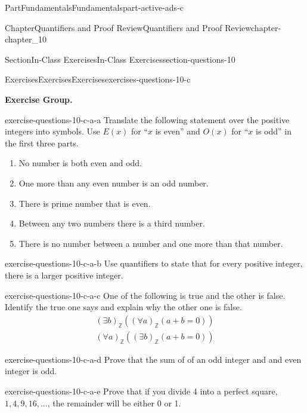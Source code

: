 \documentclass[oneside,10pt,]{book}
\numberwithin{equation}{section}
\begin{document}
\begin{partptx}{Part}{Fundamentals}{}{Fundamentals}{}{}{part-active-ads-c}
\begin{chapterptx}{Chapter}{Quantifiers and Proof Review}{}{Quantifiers and Proof Review}{}{}{chapter-chapter_10}
\begin{sectionptx}{Section}{In-Class Exercises}{}{In-Class Exercises}{}{}{section-questions-10}
%
\begin{exercises-subsection-numberless}{Exercises}{Exercises}{}{Exercises}{}{}{exercises-questions-10-c}
\par\medskip\noindent%
\textbf{Exercise Group.}\space\space%
\begin{exercisegroup}
\begin{divisionexerciseeg}{1}{}{}{exercise-questions-10-c-a-a}%
Translate the following statement over the positive integers into symbols. Use \(E(x)\) for ``\(x\) is even'' and \(O(x)\) for ``\(x\) is odd'' in the first three parts.%
\begin{enumerate}[label=(\alph*)]
\item{}No number is both even and odd.%
\item{}One more than any even number is an odd number.%
\item{}There is prime number that is even.%
\item{}Between any two numbers there is a third number.%
\item{}There is no number between a number and one more than that number.%
\end{enumerate}
%
\end{divisionexerciseeg}%
\begin{divisionexerciseeg}{2}{}{}{exercise-questions-10-c-a-b}%
Use quantifiers to state that for every positive integer, there is a larger positive integer.%
\end{divisionexerciseeg}%
\begin{divisionexerciseeg}{3}{}{}{exercise-questions-10-c-a-c}%
One of the following is true and the other is false.  Identify the true one says and explain why the other one is false.%
\begin{gather*}
(\exists  b)_{\mathbb{Z}} ((\forall a)_{\mathbb{Z}}(a + b = 0))\\
(\forall  a)_{\mathbb{Z}} ((\exists b)_{\mathbb{Z}}(a + b = 0))
\end{gather*}
%
\end{divisionexerciseeg}%
\begin{divisionexerciseeg}{4}{}{}{exercise-questions-10-c-a-d}%
Prove that the sum of of an odd integer and and even integer is odd.%
\end{divisionexerciseeg}%
\begin{divisionexerciseeg}{5}{}{}{exercise-questions-10-c-a-e}%
Prove that if you divide 4 into a perfect square, \(1, 4, 9, 16, \dots\), the remainder will be either 0 or 1.%
\end{divisionexerciseeg}%

\end{exercisegroup}
\end{exercises-subsection-numberless}
\end{sectionptx}
\end{chapterptx}
\end{partptx}
\end{document}
